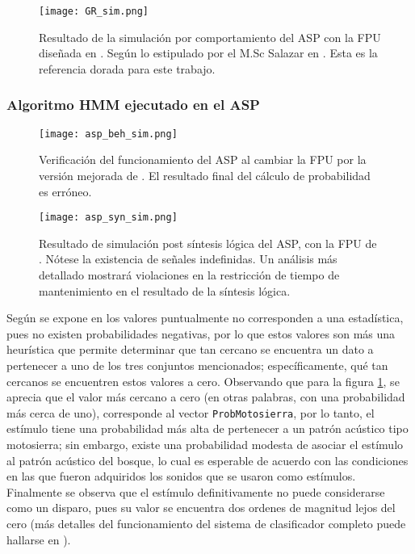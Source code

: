 \begin{figure}[ht]
\texttt{[image: GR\_sim.png]}
\centering
\caption{Resultado de la simulación por comportamiento del ASP con la FPU diseñada en \cite{Diego2015}. Según lo estipulado por el M.Sc Salazar en \cite{Carlosthesis}. Esta es la referencia dorada para este trabajo.}
\label{fig:gr_sim}
\end{figure}

\subsubsection{Algoritmo HMM ejecutado en el ASP}
\begin{figure}[h]
\texttt{[image: asp\_beh\_sim.png]}
\centering
\caption{Verificación del funcionamiento del ASP al cambiar la FPU por la versión mejorada de \cite{Francis2016, concapan}. El resultado final del cálculo de probabilidad es erróneo.}
\label{fig:asp_beh_sim}
\end{figure}

\begin{figure}[h]
\texttt{[image: asp\_syn\_sim.png]}
\centering
\caption{Resultado de simulación post síntesis lógica del ASP, con la FPU de \cite{Francis2016, concapan}. Nótese la existencia de señales indefinidas. Un análisis más detallado mostrará violaciones en la restricción de tiempo de mantenimiento en el resultado de la síntesis lógica.}
\label{fig:asp_syn_sim}
\end{figure}

Según se expone en \cite{Carlosthesis} los valores puntualmente no corresponden a una estadística, pues no existen probabilidades negativas, por lo que estos valores son más una heurística que permite determinar que tan cercano se encuentra un dato a pertenecer a uno de los tres conjuntos mencionados; específicamente, qué tan cercanos se encuentren estos valores a cero. Observando que para la figura \ref{fig:gr_sim}, se aprecia que el valor más cercano a cero (en otras palabras, con una probabilidad más cerca de uno), corresponde al vector \texttt{ProbMotosierra}, por lo tanto, el estímulo tiene una probabilidad más alta de pertenecer a un patrón acústico tipo motosierra; sin embargo, existe una probabilidad modesta de asociar el estímulo al patrón acústico del bosque, lo cual es esperable de acuerdo con las condiciones en las que fueron adquiridos los sonidos que se usaron como estímulos. Finalmente se observa que el estímulo definitivamente no puede considerarse como un disparo, pues su valor se encuentra dos ordenes de magnitud lejos del cero (más detalles del funcionamiento del sistema de clasificador completo puede hallarse en \cite{Carlosthesis, lascas_carlos, concapan}).

